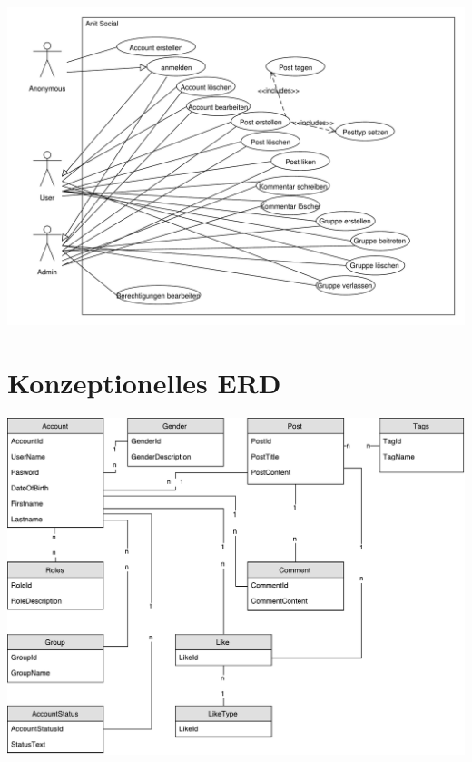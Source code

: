 \documentclass[12pt,twoside,a4paper]{article}
\begin{document}
	\includegraphics[width=15cm]{ucprj}
	
	\section{Konzeptionelles ERD}
	\includegraphics[width=15cm]{erd_a}
	
\end{document}
